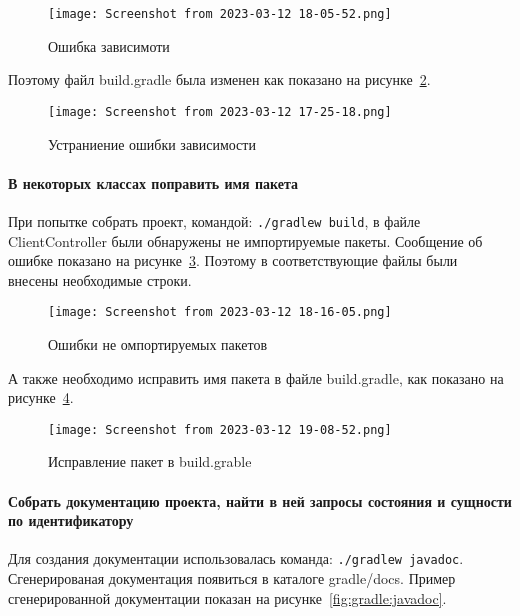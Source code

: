 \begin{figure}[h!tp]
	\centering
	\texttt{[image: Screenshot from 2023-03-12 18-05-52.png]}
	\caption{Ошибка зависимоти}
	\label{fig:gradle:dep:undisc:error}
\end{figure}

Поэтому файл build.gradle была изменен как показано
на рисунке~\ref{fig:gradle:dep:undisc:good}.

\begin{figure}[h!tp]
	\centering
	\texttt{[image: Screenshot from 2023-03-12 17-25-18.png]}
	\caption{Устраниение ошибки зависимости}
	\label{fig:gradle:dep:undisc:good}
\end{figure}

\paragraph{В некоторых классах поправить имя пакета}\mbox{}\par
При попытке собрать проект, командой: \texttt{./gradlew~build},
в файле ClientController были обнаружены не импортируемые пакеты.
Сообщение об ошибке показано на рисунке~\ref{fig:gradle:imp:error}.
Поэтому в соответствующие файлы были внесены необходимые строки.

\begin{figure}[h!tp]
	\centering
	\texttt{[image: Screenshot from 2023-03-12 18-16-05.png]}
	\caption{Ошибки не омпортируемых пакетов}
	\label{fig:gradle:imp:error}
\end{figure}

А также необходимо исправить имя пакета в файле build.gradle, как показано
на рисунке~\ref{fig:gradle:build:pack}.

\begin{figure}[h!tp]
	\centering
	\texttt{[image: Screenshot from 2023-03-12 19-08-52.png]}
	\caption{Исправление пакет в build.grable}
	\label{fig:gradle:build:pack}
\end{figure}
\paragraph{Собрать документацию проекта, найти в ней запросы состояния
и сущности по идентификатору}\mbox{}\par
Для создания документации использовалась команда: \texttt{./gradlew~javadoc}.
Сгенерированая документация появиться в каталоге gradle/docs.
Пример сгенерированной документации показан
на рисунке~\ref{fig:gradle:javadoc}.

